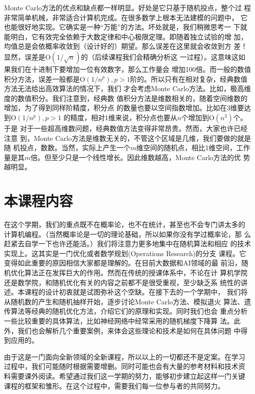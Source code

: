Monte Carlo方法的优点和缺点都一样明显。好处是它只基于随机投点，整个过
程非常简单机械，非常适合计算机完成。在很多数学上根本无法建模的问题中，
它也能很好地实现。它确实是一种``万能''的方法。坏处就是，我们稍微思考一
下就能明白，它有效完全依赖于大数定律和中心极限定理。即随着独立试验的增
加，均值总是会依概率收敛到（设计好的）期望。那么误差在这里就会收敛到方
差！显然，误差是$\mathrm{O}(1 / \sqrt{n})$的（后续课程我们会精确分析这
  一过程）。这意味这如果我们在十进制下要增加一位有效数字，那么工作量会
增加100倍。而一般的数值积分方法，误差一般都是$\mathrm{O}(1 / n^p), p >
1$阶的。所以只有在相对复杂，经典数值方法无法给出高效算法的情况下，我们
才会考虑Monte Carlo方法。比如，极高维度的数值积分。我们注意到，经典数
值积分方法是维数相关的，随着空间维数的增加，为了得到同样阶精度，积分点
的数量也要以空间指数增加。比如在3维要达到$\mathrm{O}(1 / n^p), p > 1$
的精度，相对1维来说，积分点也要从$n$个增加到$\mathrm{O}(n^3)$个。于是
对于一些超高维数问题，经典数值方法变得非常昂贵。然而，大家也许已经注意
到，Monte Carlo方法是维数无关的，不管这个区域是几维，我们要做的就是随
机投点，数数。当然，实际上产生一个$m$维空间的随机点，相比1维空间，工作
量是其$m$倍。但至少只是一个线性增长。因此维数越高，Monte Carlo方法的优
势越明显。

\section{本课程内容}
在这个学期，我们的重点既不在概率论，也不在统计，甚至也不会专门讲太多的
计算机编程。（当然概率论是一切的理论基础，所以如果你没有学过概率论，那
  么赶紧去自学一下也许还能活。）我们将注意力更多地集中在随机算法和相应
的技术实现上。这其实是一门优化或者数学规划(Operations Research)的分支
课程。它变得如此重要的原因相信大家都是理解的。在目前大数据和AI领域的最
前沿，随机优化算法正在发挥巨大的作用。然而在传统的授课体系中，不论在计
算机学院还是数学院，和随机优化有关的内容之前都不是很受重视，至少缺乏系
统性的讲述。本课程的设计初衷就是试图弥补这个空缺。在接下去的一个学期中，
我们将从随机数的产生和随机抽样开始，逐步讨论Monte Carlo方法、模拟退火
算法、遗传算法等经典的随机优化方法，介绍它们的原理和实现。同时我们也会
重点分析一些比较重要的具体算法，比如神经网络中经常采用的随机梯度下降算
法。此外，我们也会解析几个重要案例，来体会这些理论和技术是如何在具体问题
中得到应用的。

由于这是一门面向全新领域的全新课程，所以以上的一切都还不是定案。在学习
过程中，我们可能随时根据需要增删。同时可能也会有大量的参考材料和技术资
料需要课外阅读。希望通过我们这一学期的努力，能够初步建立起这样一门关键
课程的框架和雏形。在这个过程中，需要我们每一位参与者的共同努力。

